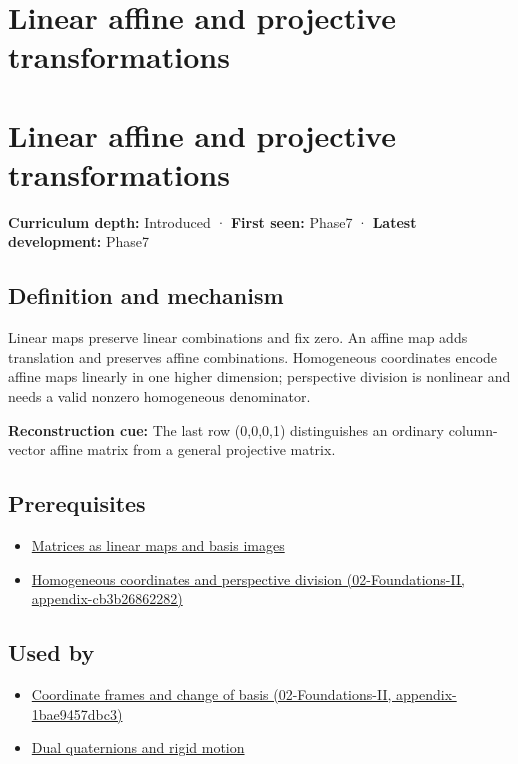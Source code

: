 \hypertarget{appendix-0bf0ca73f735}{}
\section*{Linear affine and projective transformations}
\section{Linear affine and projective transformations}\label{appendix-0bf0ca73f735-linear-affine-and-projective-transformations}

\textbf{Curriculum depth:} Introduced · \textbf{First seen:} Phase7 · \textbf{Latest development:} Phase7

\subsection{Definition and mechanism}\label{appendix-0bf0ca73f735-definition-and-mechanism}

Linear maps preserve linear combinations and fix zero. An affine map adds translation and preserves affine combinations. Homogeneous coordinates encode affine maps linearly in one higher dimension; perspective division is nonlinear and needs a valid nonzero homogeneous denominator.

\textbf{Reconstruction cue:} The last row (0,0,0,1) distinguishes an ordinary column-vector affine matrix from a general projective matrix.

\subsection{Prerequisites}\label{appendix-0bf0ca73f735-prerequisites}

\begin{itemize}
\tightlist
\item
  \hyperref[appendix-bd39c3bf5d64]{Matrices as linear maps and basis images}
\item
  \href{../02-Foundations-II/main.pdf\#nameddest=appendix-cb3b26862282}{Homogeneous coordinates and perspective division (02-Foundations-II, appendix-cb3b26862282)}
\end{itemize}

\subsection{Used by}\label{appendix-0bf0ca73f735-used-by}

\begin{itemize}
\tightlist
\item
  \href{../02-Foundations-II/main.pdf\#nameddest=appendix-1bae9457dbc3}{Coordinate frames and change of basis (02-Foundations-II, appendix-1bae9457dbc3)}
\item
  \hyperref[appendix-d1ea57347893]{Dual quaternions and rigid motion}
\end{itemize}


